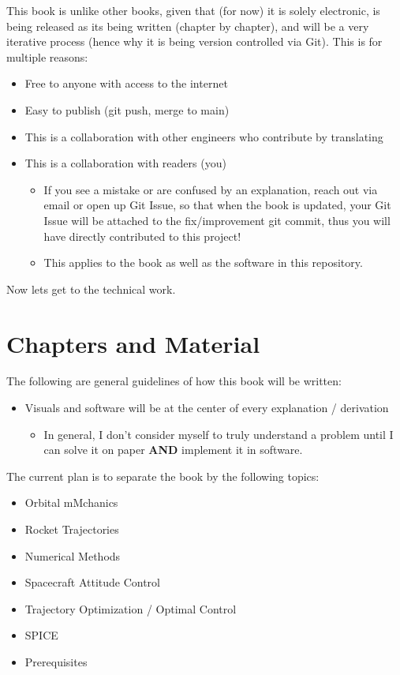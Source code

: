 \documentclass{article}
\begin{document}
This book is unlike other books, given that (for now) it is solely electronic, is being released as its being written (chapter by chapter),
and will be a very iterative process (hence why it is being version controlled via Git). This is for multiple reasons:
\begin{itemize}
	\item Free to anyone with access to the internet
	\item Easy to publish (git push, merge to main)
	\item This is a collaboration with other engineers who contribute by translating
	\item This is a collaboration with readers (you)
	\begin{itemize}
		\item If you see a mistake or are confused by an explanation, reach out
		via email or open up Git Issue, so that when the book is updated, your
		Git Issue will be attached to the fix/improvement git commit, thus you will have
		directly contributed to this project!
		\item This applies to the book as well as the software in this repository.
	\end{itemize}
\end{itemize}

Now lets get to the technical work.

\section{Chapters and Material}
The following are general guidelines of how this book will be written:
\begin{itemize}
	\item Visuals and software will be at the center of every explanation / derivation
	\begin{itemize}
		\item In general, I don't consider myself to truly understand a problem until I can solve it on paper \textbf{AND} implement it in software.
	\end{itemize}

\end{itemize}

\noindent
The current plan is to separate the book by the following topics:
\begin{itemize}
	\item Orbital mMchanics
	\item Rocket Trajectories
	\item Numerical Methods
	\item Spacecraft Attitude Control
	\item Trajectory Optimization / Optimal Control
	\item SPICE
	\item Prerequisites
\end{itemize}
 
\end{document}
